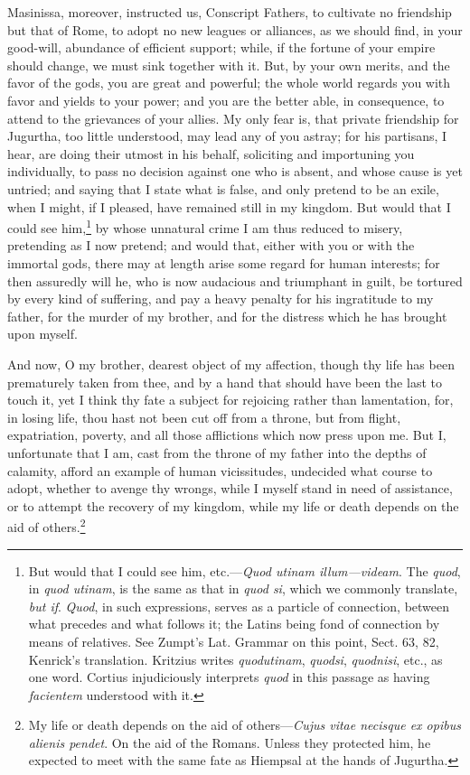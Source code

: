 Masinissa, moreover, instructed us, Conscript Fathers, to cultivate
no friendship but that of Rome, to adopt no new leagues or alliances,
as we should find, in your good-will, abundance of efficient support;
while, if the fortune of your empire should change, we must sink
together with it. But, by your own merits, and the favor of the gods,
you are great and powerful; the whole world regards you with favor and
yields to your power; and you are the better able, in consequence, to
attend to the grievances of your allies. My only fear is, that private
friendship for Jugurtha, too little understood, may lead any of you
astray; for his partisans, I hear, are doing their utmost in his
behalf, soliciting and importuning you individually, to pass no
decision against one who is absent, and whose cause is yet untried;
and saying that I state what is false, and only pretend to be an
exile, when I might, if I pleased, have remained still in my kingdom.
But would that I could see him,\footnote{But would that I could see him, etc.—\emph{Quod utinam illum—videam}.
The \emph{quod}, in \emph{quod utinam}, is the same as that in \emph{quod si}, which
we commonly translate, \emph{but if}. \emph{Quod}, in such expressions, serves
as a particle of connection, between what precedes and what follows it;
the Latins being fond of connection by means of relatives. See Zumpt's
Lat. Grammar on this point, Sect. 63, 82, Kenrick's translation.
Kritzius writes \emph{quodutinam}, \emph{quodsi}, \emph{quodnisi}, etc., as one word.
Cortius injudiciously interprets \emph{quod} in this passage as having
\emph{facientem} understood with it.} by whose unnatural crime I am thus
reduced to misery, pretending as I now pretend; and would that, either
with you or with the immortal gods, there may at length arise some
regard for human interests; for then assuredly will he, who is now
audacious and triumphant in guilt, be tortured by every kind of
suffering, and pay a heavy penalty for his ingratitude to my father,
for the murder of my brother, and for the distress which he has
brought upon myself.

And now, O my brother, dearest object of my affection, though thy
life has been prematurely taken from thee, and by a hand that should
have been the last to touch it, yet I think thy fate a subject for
rejoicing rather than lamentation, for, in losing life, thou hast not
been cut off from a throne, but from flight, expatriation, poverty,
and all those afflictions which now press upon me. But I, unfortunate
that I am, cast from the throne of my father into the depths of
calamity, afford an example of human vicissitudes, undecided what
course to adopt, whether to avenge thy wrongs, while I myself stand in
need of assistance, or to attempt the recovery of my kingdom, while my
life or death depends on the aid of others.\footnote{My life or death depends on the aid of others—\emph{Cujus vitae
necisque ex opibus alienis pendet}. On the aid of the Romans. Unless
they protected him, he expected to meet with the same fate as Hiempsal
at the hands of Jugurtha.}

